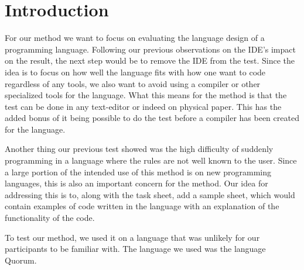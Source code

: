 \chapter{Introduction}
\label{chapter:MethodIntro}
For our method we want to focus on evaluating the language design of a programming language.
Following our previous observations on the IDE's impact on the result, the next step would be to remove the IDE from the test.
Since the idea is to focus on how well the language fits with how one want to code regardless of any tools, we also want to avoid using a compiler or other specialized tools for the language.
What this means for the method is that the test can be done in any text-editor or indeed on physical paper.
This has the added bonus of it being possible to do the test before a compiler has been created for the language.

Another thing our previous test showed was the high difficulty of suddenly programming in a language where the rules are not well known to the user.
Since a large portion of the intended use of this method is on new programming languages, this is also an important concern for the method.
Our idea for addressing this is to, along with the task sheet, add a sample sheet, which would contain examples of code written in the language with an explanation of the functionality of the code.

To test our method, we used it on a language that was unlikely for our participants to be familiar with.
The language we used was the language Quorum\cite{Quorum}.